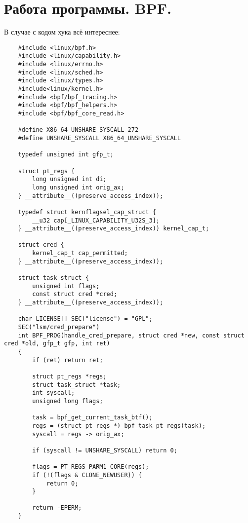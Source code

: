 \section{Работа программы. BPF.}
\label{program-bpf}

\begin{flushleft}
    В случае с кодом хука всё интереснее: 
\begin{verbatim}
    #include <linux/bpf.h>
    #include <linux/capability.h>
    #include <linux/errno.h>
    #include <linux/sched.h>
    #include <linux/types.h>
    #include<linux/kernel.h>
    #include <bpf/bpf_tracing.h>
    #include <bpf/bpf_helpers.h>
    #include <bpf/bpf_core_read.h>
    
    #define X86_64_UNSHARE_SYSCALL 272
    #define UNSHARE_SYSCALL X86_64_UNSHARE_SYSCALL
    
    typedef unsigned int gfp_t;
    
    struct pt_regs {
        long unsigned int di;
        long unsigned int orig_ax;
    } __attribute__((preserve_access_index));
    
    typedef struct kernflagsel_cap_struct {
        __u32 cap[_LINUX_CAPABILITY_U32S_3];
    } __attribute__((preserve_access_index)) kernel_cap_t;
    
    struct cred {
        kernel_cap_t cap_permitted;
    } __attribute__((preserve_access_index));
    
    struct task_struct {
        unsigned int flags;
        const struct cred *cred;
    } __attribute__((preserve_access_index));
    
    char LICENSE[] SEC("license") = "GPL";
    SEC("lsm/cred_prepare")
    int BPF_PROG(handle_cred_prepare, struct cred *new, const struct cred *old, gfp_t gfp, int ret)
    {
        if (ret) return ret;
        
        struct pt_regs *regs;
        struct task_struct *task;
        int syscall;
        unsigned long flags;
        
        task = bpf_get_current_task_btf();
        regs = (struct pt_regs *) bpf_task_pt_regs(task);    
        syscall = regs -> orig_ax;
        
        if (syscall != UNSHARE_SYSCALL) return 0;
        
        flags = PT_REGS_PARM1_CORE(regs);
        if (!(flags & CLONE_NEWUSER)) {
            return 0;
        }
        
        return -EPERM;
    }
\end{verbatim}


\end{flushleft}
